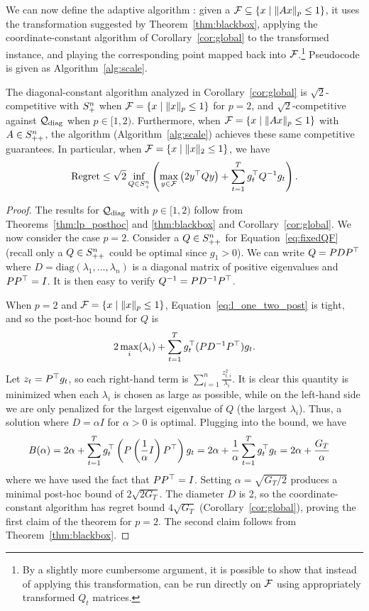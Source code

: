 We can now define the adaptive algorithm \FTPRLscale: given a $\mathcal{F}
\subseteq \left\{x \mid \| A x \|_p \leq 1\right\}$, it uses the
transformation suggested by Theorem~\ref{thm:blackbox}, applying the
coordinate-constant algorithm of Corollary~\ref{cor:global} to the
transformed instance, and playing the corresponding point mapped back
into $\mathcal{F}$.\footnote{ By a slightly more cumbersome argument, it is
possible to show that instead of applying this transformation, \FTPRL
can be run directly on $\mathcal{F}$ using appropriately transformed $Q_t$
matrices.}  Pseudocode is given as Algorithm~\ref{alg:scale}.


\begin{theorem}\label{thm:sphere}
The diagonal-constant algorithm analyzed in Corollary~\ref{cor:global}
is $\sqrt{2}$-competitive with $S^n_{+}$ when $\mathcal{F} = \left\{x \mid
\| x \|_p \leq 1\right\}$ for $p=2$, and $\sqrt{2}$-competitive against
$\mathcal{Q}_{\text{diag}}$ when $p \in [1,2)$.  Furthermore, when $\mathcal{F} = \left\{x \mid
\| Ax \|_p \leq 1\right\}$ with $A \in
S^n_{++}$, the \FTPRLscale algorithm (Algorithm~\ref{alg:scale}) achieves
these same competitive guarantees.  In particular, when $\mathcal{F} = \left\{x
\mid \| x \|_2 \leq 1\right\}$, we have
\[ \text{Regret} \leq \sqrt{2} 
\inf_{Q \in S^n_{+}} \left( \max_{y \in \mathcal{F}} \left( 2 y^\top Qy \right)
             + \sum_{t=1}^T g_t^\top Q^{-1}g_t\right).\]
\end{theorem}

\begin{proof}
The results for $\mathcal{Q}_{\text{diag}}$ with $p \in [1, 2)$ follow from
Theorems~\ref{thm:lp_posthoc} and \ref{thm:blackbox} and
Corollary~\ref{cor:global}.  We now consider the case $p=2$.  Consider
a $Q \in S^n_{++}$ for Equation~\eqref{eq:fixedQF} (recall only a
$Q \in S^n_{++}$ could be optimal since $g_1 > 0$).  We can write $Q = PDP^\top $
where $D= \text{diag}(\lambda_1, \dots,
\lambda_n)$ is a diagonal matrix of positive eigenvalues and $PP^\top =
I$.  It is then easy to verify $Q^{-1} = PD^{-1}P^\top $.  


When $p=2$ and $\mathcal{F} = \left\{x \mid\| x \|_p \leq 1\right\}$,
Equation~\eqref{eq:l_one_two_post} is tight, and so the post-hoc bound
for $Q$ is
\[2\max_i (\lambda_i) + \sum_{t=1}^T g_t^\top (P D^{-1} P^\top ) g_t.\]
Let $z_t = P^\top g_t$, so each right-hand term is 
$\sum_{i=1}^n \frac{z_{t,i}^2}{\lambda_i}$.  It is clear this quantity is
minimized when each $\lambda_i$ is chosen as large as possible, while on the
left-hand side we are only penalized for the largest eigenvalue of $Q$
(the largest $\lambda_i$).  Thus, a solution where $D
=
\alpha I$ for $\alpha >0$ is optimal.  Plugging  into
the bound, we have
\begin{align*}
B(\alpha) 
   &= 2\alpha + \sum_{t=1}^T g_t^\top \left(P \left(\frac{1}{\alpha}I\right)P^\top \right) g_t  
    = 2\alpha + \frac{1}{\alpha}\sum_{t=1}^T g_t^\top g_t  
    = 2\alpha + \frac{G_T}{\alpha}
\end{align*}
where we have used the fact that $PP^\top = I$.  Setting $\alpha =
\sqrt{G_T/2}$ produces a minimal post-hoc bound of $2\sqrt{2 G_T}$.
The diameter $D$ is 2, so the coordinate-constant algorithm
has regret bound $4 \sqrt{G_T}$ (Corollary~\ref{cor:global}), proving
the first claim of the theorem for $p=2$.  The second claim
follows from Theorem~\ref{thm:blackbox}.
\end{proof}

